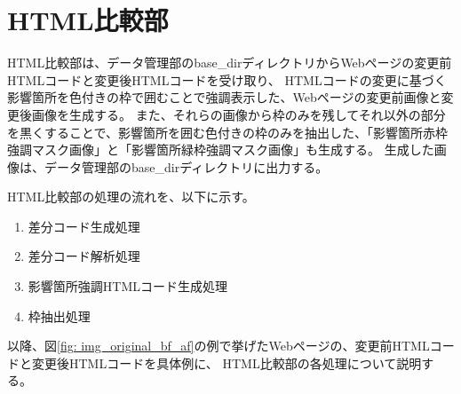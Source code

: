 \section{HTML比較部}\label{sec:Affected_area_extraction}
HTML比較部は、データ管理部のbase\_dirディレクトリからWebページの変更前HTMLコードと変更後HTMLコードを受け取り、
HTMLコードの変更に基づく影響箇所を色付きの枠で囲むことで強調表示した、Webページの変更前画像と変更後画像を生成する。
また、それらの画像から枠のみを残してそれ以外の部分を黒くすることで、影響箇所を囲む色付きの枠のみを抽出した、「影響箇所赤枠強調マスク画像」と「影響箇所緑枠強調マスク画像」も生成する。
生成した画像は、データ管理部のbase\_dirディレクトリに出力する。
\par
HTML比較部の処理の流れを、以下に示す。
\begin{enumerate}
    \item 差分コード生成処理
    \item 差分コード解析処理
    \item 影響箇所強調HTMLコード生成処理
    \item 枠抽出処理
\end{enumerate}
以降、図\ref{fig: img_original_bf_af}の例で挙げたWebページの、変更前HTMLコードと変更後HTMLコードを具体例に、
HTML比較部の各処理について説明する。

